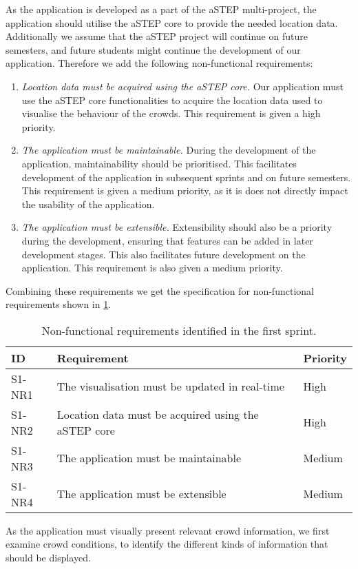 As the application is developed as a part of the aSTEP multi-project, the application should utilise the aSTEP core to provide the needed location data. Additionally we assume that the aSTEP project will continue on future semesters, and future students might continue the development of our application. Therefore we add the following non-functional requirements:

\begin{enumerate}[resume]
    \item \emph{Location data must be acquired using the aSTEP core.} Our application must use the aSTEP core functionalities to acquire the location data used to visualise the behaviour of the crowds. This requirement is given a high priority.
    \item \emph{The application must be maintainable.} During the development of the application, maintainability should be prioritised. This facilitates development of the application in subsequent sprints and on future semesters. This requirement is given a medium priority, as it is does not directly impact the usability of the application.
    \item \emph{The application must be extensible.} Extensibility should also be a priority during the development, ensuring that features can be added in later development stages. This also facilitates future development on the application. This requirement is also given a medium priority.
\end{enumerate}

Combining these requirements we get the specification for non-functional requirements shown in \cref{tab:s1_nreqs}.

\begin{table}[htbp]
	\centering
	\begin{tabularx}{\textwidth}{lXl}
		\toprule
		\textbf{ID} & \textbf{Requirement} & \textbf{Priority} \\
		\midrule 
		\rowcolor[HTML]{EFEFEF} 
		S1-NR1 & The visualisation must be updated in real-time & High \\
		S1-NR2 & Location data must be acquired using the aSTEP core & High \\
		\rowcolor[HTML]{EFEFEF} 
		S1-NR3 & The application must be maintainable & Medium \\
		S1-NR4 & The application must be extensible & Medium \\
		\bottomrule
	\end{tabularx}
	\caption{Non-functional requirements identified in the first sprint.}
	\label{tab:s1_nreqs}
\end{table}

As the application must visually present relevant crowd information, we first examine crowd conditions, to identify the different kinds of information that should be displayed.